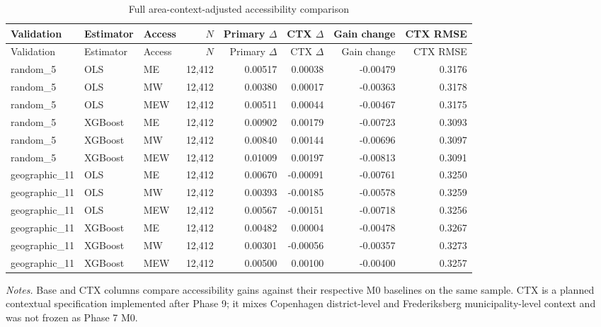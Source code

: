 \begin{landscape}
\small
\begin{longtable}{>{\raggedright\arraybackslash}p{3.5cm}>{\raggedright\arraybackslash}p{2.3cm}>{\raggedright\arraybackslash}p{2.3cm}rrrrr}
\caption{Full area-context-adjusted accessibility comparison}\label{tab:app-context-comparison}\\
\toprule
Validation & Estimator & Access & $N$ & Primary $\Delta$ & CTX $\Delta$ & Gain change & CTX RMSE \\
\midrule
\endfirsthead
\toprule
Validation & Estimator & Access & $N$ & Primary $\Delta$ & CTX $\Delta$ & Gain change & CTX RMSE \\
\midrule
\endhead
random\_\allowbreak{}5 & OLS & ME & 12,412 & 0.00517 & 0.00038 & -0.00479 & 0.3176 \\
random\_\allowbreak{}5 & OLS & MW & 12,412 & 0.00380 & 0.00017 & -0.00363 & 0.3178 \\
random\_\allowbreak{}5 & OLS & MEW & 12,412 & 0.00511 & 0.00044 & -0.00467 & 0.3175 \\
random\_\allowbreak{}5 & XGBoost & ME & 12,412 & 0.00902 & 0.00179 & -0.00723 & 0.3093 \\
random\_\allowbreak{}5 & XGBoost & MW & 12,412 & 0.00840 & 0.00144 & -0.00696 & 0.3097 \\
random\_\allowbreak{}5 & XGBoost & MEW & 12,412 & 0.01009 & 0.00197 & -0.00813 & 0.3091 \\
geographic\_\allowbreak{}11 & OLS & ME & 12,412 & 0.00670 & -0.00091 & -0.00761 & 0.3250 \\
geographic\_\allowbreak{}11 & OLS & MW & 12,412 & 0.00393 & -0.00185 & -0.00578 & 0.3259 \\
geographic\_\allowbreak{}11 & OLS & MEW & 12,412 & 0.00567 & -0.00151 & -0.00718 & 0.3256 \\
geographic\_\allowbreak{}11 & XGBoost & ME & 12,412 & 0.00482 & 0.00004 & -0.00478 & 0.3267 \\
geographic\_\allowbreak{}11 & XGBoost & MW & 12,412 & 0.00301 & -0.00056 & -0.00357 & 0.3273 \\
geographic\_\allowbreak{}11 & XGBoost & MEW & 12,412 & 0.00500 & 0.00100 & -0.00400 & 0.3257 \\
\bottomrule
\end{longtable}
{\footnotesize\noindent\emph{Notes.} Base and CTX columns compare accessibility gains against their respective M0 baselines on the same sample. CTX is a planned contextual specification implemented after Phase 9; it mixes Copenhagen district-level and Frederiksberg municipality-level context and was not frozen as Phase 7 M0.\par}
\end{landscape}
